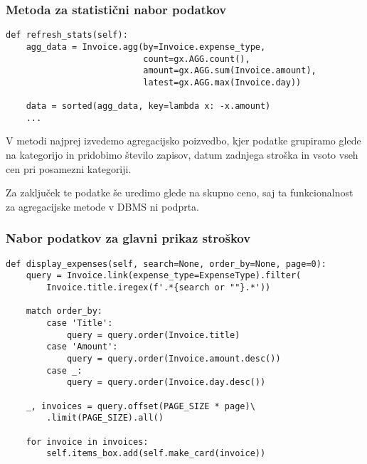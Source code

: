 \documentclass[a4paper,12pt,openright]{book}
\begin{document}
    \subsubsection{Metoda za statistični nabor podatkov}

\begin{verbatim}
def refresh_stats(self):
    agg_data = Invoice.agg(by=Invoice.expense_type,
                           count=gx.AGG.count(), 
                           amount=gx.AGG.sum(Invoice.amount), 
                           latest=gx.AGG.max(Invoice.day))
    
    data = sorted(agg_data, key=lambda x: -x.amount)
    ...
\end{verbatim}

    \noindent
    V metodi najprej izvedemo agregacijsko poizvedbo, kjer podatke grupiramo glede na kategorijo in pridobimo število zapisov, datum zadnjega stroška in vsoto vseh cen pri posamezni kategoriji.

    Za zaključek te podatke še uredimo glede na skupno ceno, saj ta funkcionalnost za agregacijske metode v DBMS ni podprta.

    \subsubsection{Nabor podatkov za glavni prikaz stroškov}
    
\begin{verbatim}
def display_expenses(self, search=None, order_by=None, page=0):
    query = Invoice.link(expense_type=ExpenseType).filter(
        Invoice.title.iregex(f'.*{search or ""}.*'))

    match order_by:
        case 'Title':
            query = query.order(Invoice.title)
        case 'Amount':
            query = query.order(Invoice.amount.desc())
        case _:
            query = query.order(Invoice.day.desc())
    
    _, invoices = query.offset(PAGE_SIZE * page)\
        .limit(PAGE_SIZE).all()
    
    for invoice in invoices:
        self.items_box.add(self.make_card(invoice))
\end{verbatim}
\end{document}
